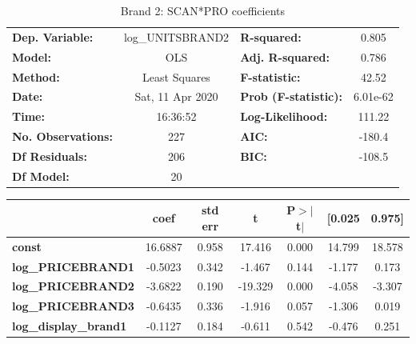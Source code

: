\documentclass[a4paper,11pt]{article}
\begin{document}
\begin{center}
\begin{table}
\caption{Brand 2: SCAN*PRO coefficients}\label{tab:brand2}
\begin{tabular}{lclc}
\toprule
\textbf{Dep. Variable:}        & log\_UNITSBRAND2 & \textbf{  R-squared:         } &     0.805   \\
\textbf{Model:}                &       OLS        & \textbf{  Adj. R-squared:    } &     0.786   \\
\textbf{Method:}               &  Least Squares   & \textbf{  F-statistic:       } &     42.52   \\
\textbf{Date:}                 & Sat, 11 Apr 2020 & \textbf{  Prob (F-statistic):} &  6.01e-62   \\
\textbf{Time:}                 &     16:36:52     & \textbf{  Log-Likelihood:    } &    111.22   \\
\textbf{No. Observations:}     &         227      & \textbf{  AIC:               } &    -180.4   \\
\textbf{Df Residuals:}         &         206      & \textbf{  BIC:               } &    -108.5   \\
\textbf{Df Model:}             &          20      & \textbf{                     } &             \\
\bottomrule
\end{tabular}
\end{table}
\begin{tabular}{lcccccc}
                               & \textbf{coef} & \textbf{std err} & \textbf{t} & \textbf{P$> |$t$|$} & \textbf{[0.025} & \textbf{0.975]}  \\
\midrule
\textbf{const}                 &      16.6887  &        0.958     &    17.416  &         0.000        &       14.799    &       18.578     \\
\textbf{log\_PRICEBRAND1}      &      -0.5023  &        0.342     &    -1.467  &         0.144        &       -1.177    &        0.173     \\
\textbf{log\_PRICEBRAND2}      &      -3.6822  &        0.190     &   -19.329  &         0.000        &       -4.058    &       -3.307     \\
\textbf{log\_PRICEBRAND3}      &      -0.6435  &        0.336     &    -1.916  &         0.057        &       -1.306    &        0.019     \\
\textbf{log\_display\_brand1}  &      -0.1127  &        0.184     &    -0.611  &         0.542        &       -0.476    &        0.251     \\

\end{tabular}
\end{center}
\end{document}
